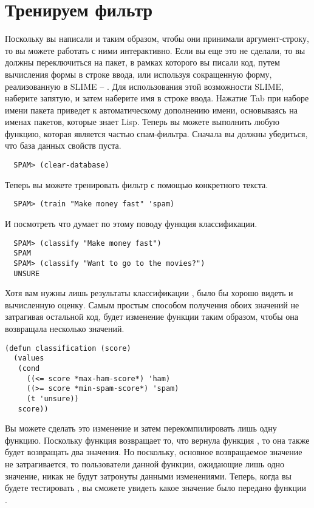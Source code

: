 \section{Тренируем фильтр}

Поскольку вы написали  и  таким образом, чтобы они принимали
аргумент-строку, то вы можете работать с ними интерактивно.  Если вы еще это не сделали,
то вы должны переключиться на пакет, в рамках которого вы писали код, путем вычисления
формы  в строке ввода, или используя сокращенную форму, реализованную в
SLIME -- .  Для использования этой возможности SLIME, наберите
запятую, и затем наберите имя в строке ввода.  Нажатие Tab при наборе имени пакета
приведет к автоматическому дополнению имени, основываясь на именах пакетов, которые знает
Lisp.  Теперь вы можете выполнить любую функцию, которая является частью спам-фильтра.
Сначала вы должны убедиться, что база данных свойств пуста.

\begin{verbatim}
  SPAM> (clear-database)
\end{verbatim}

Теперь вы можете тренировать фильтр с помощью конкретного текста.

\begin{verbatim}
  SPAM> (train "Make money fast" 'spam)
\end{verbatim}

И посмотреть что думает по этому поводу функция классификации.

\begin{verbatim}
  SPAM> (classify "Make money fast")
  SPAM
  SPAM> (classify "Want to go to the movies?")
  UNSURE
\end{verbatim}

Хотя вам нужны лишь результаты классификации , было бы хорошо видеть и вычисленную оценку.
Самым простым способом получения обоих значений не затрагивая остальной код, будет
изменение функции  таким образом, чтобы она возвращала несколько
значений.

\begin{lstlisting}
(defun classification (score)
  (values
   (cond
     ((<= score *max-ham-score*) 'ham)
     ((>= score *min-spam-score*) 'spam)
     (t 'unsure))
   score))
\end{lstlisting}

Вы можете сделать это изменение и затем перекомпилировать лишь одну функцию.  Поскольку
функция  возвращает то, что вернула функция , то она
также будет возвращать два значения.  Но поскольку, основное возвращаемое значение не
затрагивается, то пользователи данной функции, ожидающие лишь одно значение, никак не
будут затронуты данными изменениями.  Теперь, когда вы будете тестировать ,
вы сможете увидеть какое значение было передано функции .

